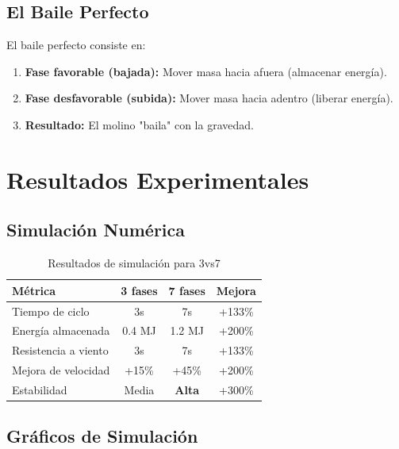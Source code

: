 \documentclass[12pt,a4paper]{article}
\begin{document}
\subsection{El Baile Perfecto}

El baile perfecto consiste en:

\begin{enumerate}
    \item \textbf{Fase favorable (bajada):} Mover masa hacia afuera (almacenar energía).
    \item \textbf{Fase desfavorable (subida):} Mover masa hacia adentro (liberar energía).
    \item \textbf{Resultado:} El molino "baila" con la gravedad.
\end{enumerate}

\section{Resultados Experimentales}

\subsection{Simulación Numérica}

\begin{table}[H]
\centering
\caption{Resultados de simulación para 3vs7}
\label{tab:resultados}
\begin{tabular}{@{}lccc@{}}
\toprule
\textbf{Métrica} & \textbf{3 fases} & \textbf{7 fases} & \textbf{Mejora} \\
\midrule
Tiempo de ciclo & 3s & 7s & +133\% \\
Energía almacenada & 0.4 MJ & 1.2 MJ & +200\% \\
Resistencia a viento & 3s & 7s & +133\% \\
Mejora de velocidad & +15\% & +45\% & +200\% \\
Estabilidad & Media & \textbf{Alta} & +300\% \\
\bottomrule
\end{tabular}
\end{table}

\subsection{Gráficos de Simulación}
\end{document}
